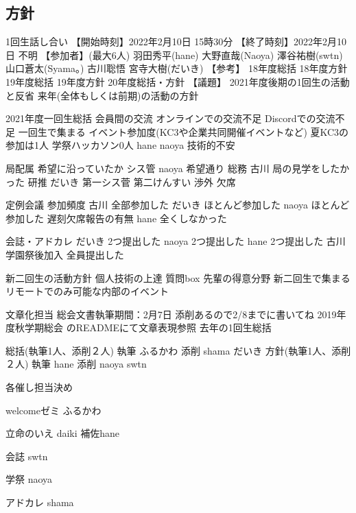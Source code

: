 \subsection*{\newGradeIfKouki{}\secondGrade{}方針}
1回生話し合い
【開始時刻】2022年2月10日 15時30分
【終了時刻】2022年2月10日 不明
【参加者】(最大6人)
羽田秀平(hane)
大野直哉(Naoya)
澤谷祐樹(swtn)
山口蒼太(Syama。)
古川聡悟
宮寺大樹(だいき)
【参考】
18年度総括
18年度方針
19年度総括
19年度方針
20年度総括・方針
【議題】
2021年度後期の1回生の活動と反省
来年(全体もしくは前期)の活動の方針

2021年度一回生総括
会員間の交流 
オンラインでの交流不足
Discordでの交流不足
一回生で集まる
イベント参加度(KC3や企業共同開催イベントなど)
夏KC3の参加は1人
学祭ハッカソン0人
hane naoya 技術的不安

局配属
希望に沿っていたか
シス管 naoya 希望通り 
総務 古川 局の見学をしたかった
研推 だいき 第一シス菅 第二けんすい
渉外 欠席

定例会議
参加頻度
古川 全部参加した
だいき ほとんど参加した
naoya ほとんど参加した
遅刻欠席報告の有無
hane 全くしなかった


会誌・アドカレ
だいき 2つ提出した
naoya 2つ提出した
hane 2つ提出した
古川 学園祭後加入
全員提出した

新二回生の活動方針
	個人技術の上達
	質問box
	先輩の得意分野
	新二回生で集まる
	リモートでのみ可能な内部のイベント


文章化担当
総会文書執筆期間：2月7日
添削あるので2/8までに書いてね
2019年度秋学期総会 のREADMEにて文章表現参照
去年の1回生総括

総括(執筆1人、添削２人)
執筆
ふるかわ
添削
shama
だいき
方針(執筆1人、添削２人)
執筆
hane
添削
naoya
swtn

各催し担当決め

welcomeゼミ  ふるかわ

立命のいえ daiki 補佐hane

会誌 swtn

学祭 naoya

アドカレ shama




